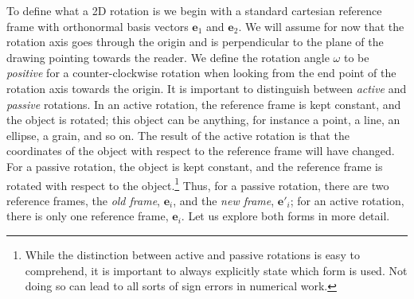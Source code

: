 To define what a 2D rotation is we begin with a standard cartesian reference frame with orthonormal basis vectors $\mathbf{e}_1$ and $\mathbf{e}_2$. We will assume for now that the rotation axis goes through the origin and is perpendicular to the plane of the drawing pointing towards the reader.  We define the rotation angle $\omega$ to be \textit{positive} for a counter-clockwise rotation when looking from the end point of the rotation axis towards the origin.  It is important to distinguish between \textit{active} and \textit{passive} rotations. In an active rotation, the reference frame is kept constant, and the object is rotated; this object can be anything, for instance a point, a line, an ellipse, a grain, and so on.  The result of the active rotation is that the coordinates of the object with respect to the reference frame will have changed.  For a passive rotation, the object is kept constant, and the reference frame is rotated with respect to the object.\footnote{While the distinction between active and passive rotations is easy to comprehend, it is important to always explicitly state which form is used.  Not doing so can lead to all sorts of sign errors in numerical work.}  Thus, for a passive rotation, there are two reference frames, the \textit{old frame}, $\mathbf{e}_i$, and the \textit{new frame}, $\mathbf{e}'_i$; for an active rotation, there is only one reference frame, $\mathbf{e}_i$.  Let us explore both forms in more detail.


